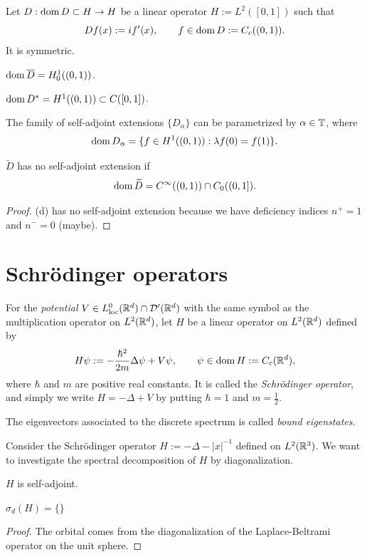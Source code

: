 \documentclass{../../large}
\begin{document}
\begin{prb}
Let $D:\operatorname{dom} D\subset H\to H$ be a linear operator $H:=L^2([0,1])$ such that
\[Df(x):=if'(x),\qquad f\in\operatorname{dom} D:=C_c((0,1)).\]
It is symmetric.

\begin{parts}
\item $\operatorname{dom}\overline D=H_0^1((0,1))$.
\item $\operatorname{dom} D^*=H^1((0,1))\subset C([0,1])$.
\item The family of self-adjoint extensions $\{D_\alpha\}$ can be parametrized by $\alpha\in\mathbb{T}$, where
\[\operatorname{dom} D_\alpha=\{f\in H^1((0,1)):\lambda f(0)=f(1)\}.\]
\item $\tilde D$ has no self-adjoint extension if
\[\operatorname{dom}\widetilde D=C^\infty((0,1))\cap C_0((0,1]).\]
\end{parts}
\end{prb}
\begin{proof}
(d)
has no self-adjoint extension because we have deficiency indices $n^+=1$ and $n^-=0$ (maybe).
\end{proof}





\chapter{Schr\"odinger operators}


\begin{prb}
For the \emph{potential} $V\in L^0_{\mathrm{loc}}(\mathbb{R}^d)\cap\mathcal{D}'(\mathbb{R}^d)$ with the same symbol as the multiplication operator on $L^2(\mathbb{R}^d)$, let $H$ be a linear operator on $L^2(\mathbb{R}^d)$ defined by
\[H\psi:=-\frac{\hbar^2}{2m}\Delta\psi+V\psi,\qquad\psi\in\operatorname{dom} H:=C_c(\mathbb{R}^d),\]
where $\hbar$ and $m$ are positive real constants.
It is called the \emph{Schr\"odinger operator}, and simply we write $H=-\Delta+V$ by putting $\hbar=1$ and $m=\frac12$.

The eigenvectors associated to the discrete spectrum is called \emph{bound eigenstates}.


\end{prb}


\begin{prb}
Consider the Schr\"odinger operator $H:=-\Delta-|x|^{-1}$ defined on $L^2(\mathbb{R}^3)$.
We want to investigate the spectral decomposition of $H$ by diagonalization.
\begin{parts}
\item $H$ is self-adjoint.
\item $\sigma_d(H)=\{\}$
\end{parts}
\end{prb}
\begin{proof}
The orbital comes from the diagonalization of the Laplace-Beltrami operator on the unit sphere.
\end{proof}
\end{document}
